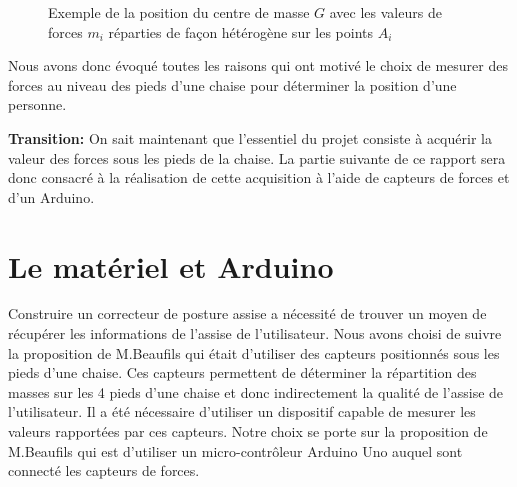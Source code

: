 \documentclass{polytech/polytech}
\begin{document}
\begin{figure}[htbp]
\begin{center}
\end{center}
\caption{Exemple de la position du centre de masse $G$ avec les valeurs de forces $m_i$ réparties de façon hétérogène sur les points $A_i$ }
\label{fig:schem_plan_sol_math_G}
\end{figure}

Nous avons donc évoqué toutes les raisons qui ont motivé le choix de mesurer des forces au niveau des pieds d'une chaise pour déterminer la position d'une personne.

\textbf{Transition:} On sait maintenant que l'essentiel du projet consiste à acquérir la valeur des forces sous les pieds de la chaise. La partie suivante de ce rapport sera donc consacré à la réalisation de cette acquisition à l'aide de capteurs de forces et d'un Arduino.

\section{Le matériel et Arduino}
\label{chap:arduino}

Construire un correcteur de posture assise a nécessité de trouver un moyen de récupérer les informations de l'assise de l'utilisateur. Nous avons choisi de suivre la proposition de M.Beaufils qui était d'utiliser des capteurs positionnés sous les pieds d'une chaise. Ces capteurs permettent de déterminer la répartition des masses sur les 4 pieds d'une chaise et donc indirectement la qualité de l'assise de l'utilisateur. Il a été nécessaire d'utiliser un dispositif capable de mesurer les valeurs rapportées par ces capteurs. Notre choix se porte sur la proposition de M.Beaufils qui est d'utiliser un  micro-contrôleur Arduino Uno auquel sont connecté les capteurs de forces. 
\end{document}
